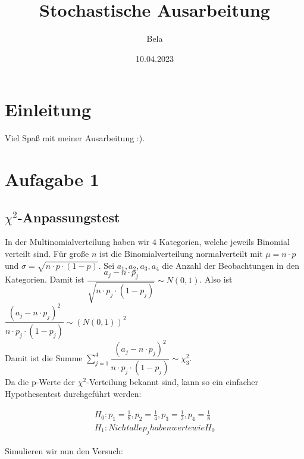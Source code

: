\documentclass[]{article}
\title{Stochastische Ausarbeitung}
\author{Bela}
\date{10.04.2023}
\begin{document}
\maketitle

{
\setcounter{tocdepth}{2}
\tableofcontents
}
\hypertarget{einleitung}{%
\section{Einleitung}\label{einleitung}}

Viel Spaß mit meiner Ausarbeitung :).

\hypertarget{aufagabe-1}{%
\section{Aufagabe 1}\label{aufagabe-1}}

\hypertarget{chi2-anpassungstest}{%
\subsection{\texorpdfstring{\(\chi^2\)-Anpassungstest}{\textbackslash{}chi\^{}2-Anpassungstest}}\label{chi2-anpassungstest}}

In der Multinomialverteilung haben wir \(4\) Kategorien, welche jeweils Binomial verteilt sind.
Für große \(n\) ist die Binomialverteilung normalverteilt mit \(\mu = n \cdot p\) und \(\sigma = \sqrt{n \cdot p \cdot (1-p)}\).
Sei \(a_1, a_2, a_3, a_4\) die Anzahl der Beobachtungen in den Kategorien. Damit ist \(\dfrac{a_j-n \cdot p_j}{\sqrt{n \cdot p_j \cdot (1-p_j)}}\sim N(0,1)\).
Also ist \(\dfrac{(a_j-n \cdot p_j)^2}{n \cdot p_j \cdot (1-p_j)}\sim (N(0,1))^2\)\\
Damit ist die Summe \(\sum_{j=1}^4 \dfrac{(a_j-n \cdot p_j)^2}{n \cdot p_j \cdot (1-p_j)}\sim \chi^2_3\).\\
Da die p-Werte der \(\chi^2\)-Verteilung bekannt sind, kann so ein einfacher Hypothesentest durchgeführt werden:

\[\begin{aligned}H_0: p_1 = \frac18, p_2 = \frac14, p_3 = \frac12, p_4 = \frac18  \\
H_1: Nicht alle p_j haben werte wie H_0\end{aligned}\]

Simulieren wir nun den Versuch:
\end{document}
